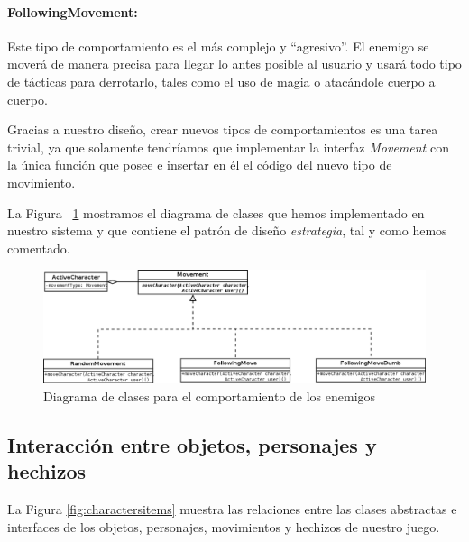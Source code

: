 \paragraph{FollowingMovement:} Este tipo de comportamiento es el más complejo y ``agresivo''. El enemigo se moverá de manera precisa para llegar lo antes posible al usuario y usará todo tipo de tácticas para derrotarlo, tales como el uso de magia o atacándole cuerpo a cuerpo.

\noindent Gracias a nuestro diseño, crear nuevos tipos de comportamientos es una tarea trivial, ya que solamente tendríamos que implementar la interfaz \textit{Movement} con la única función que posee e insertar en él el código del nuevo tipo de movimiento.

La Figura ~\ref{fig:iaenemy} mostramos el diagrama de clases que hemos implementado en nuestro sistema y que contiene el patrón de diseño \textit{estrategia}, tal y como hemos comentado.

\begin{figure}
    \includegraphics[width=\textwidth,height=\textheight,keepaspectratio]{./img/iaenemy.png}
  \caption{Diagrama de clases para el comportamiento de los enemigos}
  \label{fig:iaenemy}
\end{figure}

\subsection{Interacción entre objetos, personajes y hechizos}

La Figura \ref{fig:charactersitems} muestra las relaciones entre las clases abstractas e interfaces de los objetos, personajes, movimientos y hechizos de nuestro juego.

